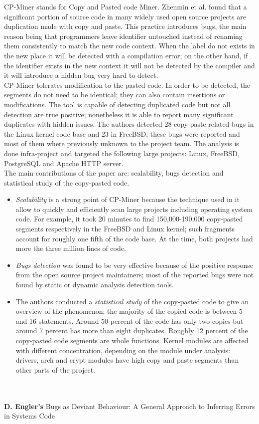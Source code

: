 CP-Miner stands for Copy and Pasted code Miner. Zhenmin et al. found that a significant portion of source code in many widely used open source projects are duplication made with copy and paste. This practice introduces bugs, the main reason being that programmers leave identifier untouched instead of renaming them consistently to match the new code context. When the label do not exists in the new place it will be detected with a compilation error; on the other hand, if the identifier exists in the new context it will not be detected by the compiler and it will introduce a hidden bug very hard to detect.\\
CP-Miner tolerates modification to the pasted code. In order to be detected, the segments do not need to be identical; they can also contain insertions or modifications. The tool is capable of detecting duplicated code but not all detection are true positive; nonetheless it is able to report many significant duplicates with hidden issues. The authors detected 28 copy-paste related bugs in the Linux kernel code base and 23 in FreeBSD; these bugs were reported and most of them where previously unknown to the project team.
The analysis is done infra-project and targeted the following large projects: Linux, FreeBSD, PostgreSQL and Apache HTTP server.
\\
The main contributions of the paper are: scalability, bugs detection and statistical study of the copy-pasted code. 
\begin{itemize}
    \item \emph{Scalability} is a strong point of CP-Miner because the technique used in it allow to quickly and efficiently scan large projects including operating system code. For example, it took 20 minutes to find 150,000-190,000 copy-pasted segments respectively in the FreeBSD and Linux kernel; such fragments account for roughly one fifth of the code base. At the time, both projects had more the three million lines of code. 
    \item \emph{Bugs detection} was found to be very effective because of the positive response from the open source project maintainers; most of the reported bugs were not found by static or dynamic analysis detection tools. 
    \item The authors conducted a \emph{statistical study} of the copy-pasted code to give an overview of the phenomenon; the majority of the copied code is between 5 and 16 statements. Around 50 percent of the code has only two copies but around 7 percent has more than eight duplicates. Roughly 12 percent of the copy-pasted code segments are whole functions. Kernel modules are affected with different concentration, depending on the module under analysis: drivers, arch and crypt modules have high copy and paste segments than other parts of the project.
\end{itemize}
\\
\\
\textbf{D. Engler's} \cite{engler2001bugs} Bugs as Deviant Behaviour: A General Approach to Inferring Errors in Systems Code

